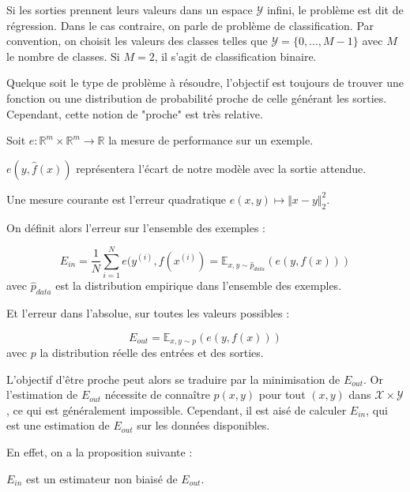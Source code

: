 Si les sorties prennent leurs valeurs dans un espace $\mathcal{Y}$ infini, le problème est dit de régression. Dans le cas contraire, on parle de problème de classification. Par convention, on choisit les valeurs des classes telles que $\mathcal{Y} = \{0, ..., M-1\}$ avec $M$ le nombre de classes. Si $M = 2$, il s'agit de classification binaire.

Quelque soit le type de problème à résoudre, l'objectif est toujours de trouver une fonction ou une distribution de probabilité proche de celle générant les sorties. Cependant, cette notion de "proche" est très relative. 

\begin{definition}
Soit $e : \mathbb{R}^m \times \mathbb{R}^m \rightarrow \mathbb{R}$ la mesure de performance sur un exemple.
\end{definition}
$e(y, \hat{f}(x))$ représentera l'écart de notre modèle avec la sortie attendue. 

\begin{example}
Une mesure courante est l'erreur quadratique $e(x, y) \mapsto \Vert x - y \Vert_2^2$.
\end{example}

On définit alors l'erreur sur l'ensemble des exemples :

\begin{definition}
$$
E_{in} = \frac{1}{N}\sum_{i=1}^{N}{e(y^{(i)}, f(x^{(i)})} = \mathbb{E}_{x, y \sim \hat{p}_{data}}(e(y, f(x)))
$$
avec $\hat{p}_{data}$ est la distribution empirique dans l'ensemble des exemples.
\end{definition}

Et l'erreur dans l'absolue, sur toutes les valeurs possibles :

\begin{definition}
$$
E_{out} = \mathbb{E}_{x, y \sim p}(e(y, f(x)))
$$
avec $p$ la distribution réelle des entrées et des sorties.
\end{definition}

L'objectif d'être proche peut alors se traduire par la minimisation de $E_{out}$. Or l'estimation de $E_{out}$ nécessite de connaître $p(x, y)$ pour tout $(x, y)$ dans $\mathcal{X} \times \mathcal{Y}$, ce qui est généralement impossible. Cependant, il est aisé de calculer $E_{in}$, qui est une estimation de $E_{out}$ sur les données disponibles. 

En effet, on a la proposition suivante :
\begin{proposition}
$E_{in}$ est un estimateur non biaisé de $E_{out}$.
\end{proposition}


